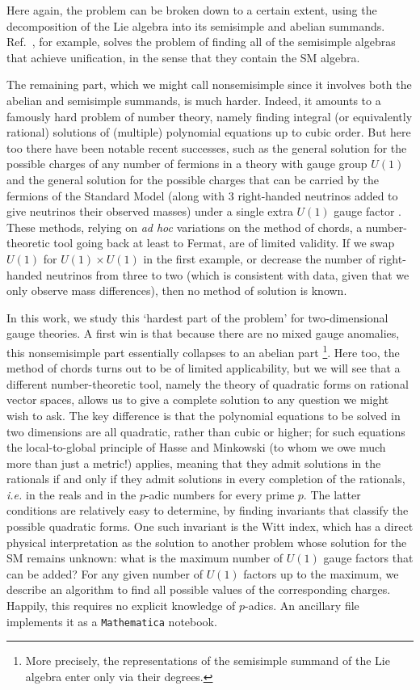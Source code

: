 \documentclass[11pt,a4paper]{article}
\begin{document}
        Here again, the problem can be broken down to a certain extent, using the decomposition of the Lie algebra into its semisimple and abelian summands. Ref.~\cite{Allanach:2021bfe}, for example, solves the problem of finding all of the semisimple algebras that achieve unification, in the sense that they contain the SM algebra. 

        The remaining part, which we might call nonsemisimple since it involves both the abelian and semisimple summands, is much harder. Indeed, it amounts to a famously hard problem of number theory, namely finding integral (or equivalently rational) solutions of (multiple) polynomial equations up to cubic order.
But here too there have been notable recent successes, such as the general solution for the possible charges of any number of fermions in a theory with gauge group $U(1)$ \cite{PhysRevLett.123.151601,Allanach2019GeometricGS} and the general solution for the possible charges that can be carried by the fermions of the Standard Model (along with 3 right-handed neutrinos added to give neutrinos their observed masses) under a single extra $U(1)$ gauge factor \cite{PhysRevLett.125.161601}. These methods, relying on {\em ad hoc} variations on the method of chords, a number-theoretic tool going back at least to Fermat, are of limited validity. If we swap $U(1)$ for $U(1) \times U(1)$ in the first example, or decrease the number of right-handed neutrinos from three to two (which is consistent with data, given that we only observe mass differences), then no method of solution is known. 

In this work, we study this `hardest part of the problem' for two-dimensional gauge theories. A first win is that because there are no mixed gauge anomalies, this nonsemisimple part essentially collapses to an abelian part \footnote{More precisely, the representations of the semisimple summand of the Lie algebra enter only via their degrees.}. Here too, the method of chords turns out to be of limited applicability, but we will see that a different number-theoretic tool, namely the theory of quadratic forms on rational vector spaces, allows us to give a complete solution to any question we might wish to ask. The key difference is that the polynomial equations to be solved in two dimensions are all quadratic, rather than cubic or higher; for such equations the local-to-global principle of Hasse and Minkowski (to whom we owe much more than just a metric!) applies, meaning that they admit solutions in the rationals if and only if they admit solutions in every completion of the rationals, {\em i.e.} in the reals and in the $p$-adic numbers for every prime $p$. The latter conditions are relatively easy to determine, by finding invariants that classify the possible quadratic forms.
 One such invariant is the Witt index, which has a direct physical interpretation as the solution to another problem whose solution for the SM remains unknown: what is the maximum number of $U(1)$ gauge factors that can be added?  
For any given number of $U(1)$ factors up to the maximum, we describe an algorithm
to find all possible values of the corresponding charges. Happily, this requires no explicit knowledge of $p$-adics. An ancillary file implements it as a {\tt Mathematica} notebook.
\end{document}
